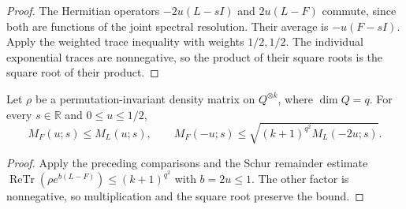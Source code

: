 \begin{proof}
\leanok
The Hermitian operators $-2u(L-sI)$ and $2u(L-F)$ commute, since both are
functions of the joint spectral resolution. Their average is $-u(F-sI)$.
Apply the weighted trace inequality with weights $1/2,1/2$. The individual
exponential traces are nonnegative, so the product of their square roots
is the square root of their product.
\end{proof}

\begin{theorem}
\label{thm:schur-label-copy-centered}
\leanok
Let $\rho$ be a permutation-invariant density matrix on $Q^{\otimes k}$,
where $\dim Q=q$. For every $s\in\mathbb R$ and $0\le u\le1/2$,
\[
 M_F(u;s)\le M_L(u;s),\qquad
 M_F(-u;s)\le\sqrt{(k+1)^{q^2}M_L(-2u;s)}.
\]
\end{theorem}

\begin{proof}
\leanok
Apply the preceding comparisons and the Schur remainder estimate
$\operatorname{ReTr}(\rho e^{b(L-F)})\le(k+1)^{q^2}$ with $b=2u\le1$.
The other factor is nonnegative, so multiplication and the square root
preserve the bound.
\end{proof}
